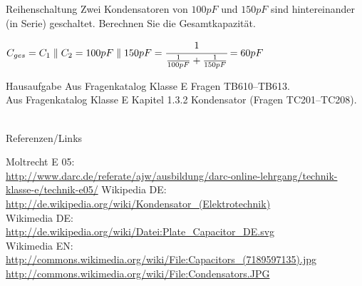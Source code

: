 \begin{frame}
  \begin{exampleblock}{Reihenschaltung}
    Zwei Kondensatoren von $100 pF$ und $150 pF$ sind hintereinander (in Serie) geschaltet. Berechnen Sie die Gesamtkapazität.
  \end{exampleblock}
  \pause
  \begin{center}
    $C_{ges} = C_1 \parallel C_2 = 100 pF \parallel 150 pF = \cfrac{1}{\frac{1}{100 pF} + \frac{1}{150 pF}} = 60 pF$
  \end{center}
\end{frame}

\begin{frame}
  \begin{alertblock}{Hausaufgabe}
    Aus Fragenkatalog Klasse E Fragen TB610--TB613.\\
    Aus Fragenkatalog Klasse E Kapitel 1.3.2 Kondensator (Fragen TC201--TC208).
  \end{alertblock}
\end{frame}



\renewcommand{\refname}{Referenzen}

\hypertarget{refs}{}
\textcolor{white}{} \\ %
\Large Referenzen/Links
\footnotesize

\begin{thebibliography}{}
       Moltrecht E 05: \\
                    \url{http://www.darc.de/referate/ajw/ausbildung/darc-online-lehrgang/technik-klasse-e/technik-e05/}
        Wikipedia DE: \\
                    \url{http://de.wikipedia.org/wiki/Kondensator_(Elektrotechnik)}\\ 
    	Wikimedia DE:\\
    				\url{http://de.wikipedia.org/wiki/Datei:Plate_Capacitor_DE.svg}\\
   		Wikimedia EN:\\
   					\url{http://commons.wikimedia.org/wiki/File:Capacitors_(7189597135).jpg}\\
   					\url{http://commons.wikimedia.org/wiki/File:Condensators.JPG}
\end{thebibliography} 



